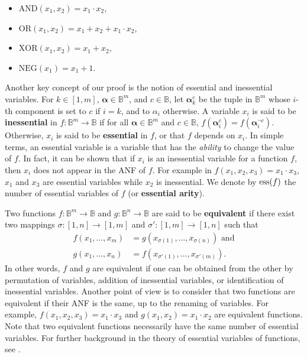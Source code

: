 \begin{itemize}
  \item $\text{AND}(x_1, x_2) = x_1 \cdot x_2$,
  \item $\text{OR}(x_1, x_2) = x_1 + x_2 + x_1 \cdot x_2$,
  \item $\text{XOR}(x_1, x_2) = x_1 + x_2$,
  \item $\text{NEG}(x_1) = x_1 + 1$.
\end{itemize}

Another key concept of our proof is the notion of essential and inessential
variables.  For $k\in [1,m]$, $\boldsymbol{\alpha}\in \mathbb{B}^m$, and $c \in
\mathbb{B}$, let ${\boldsymbol{\alpha}}_{k}^c$ be the tuple in $\mathbb{B}^{m}$
whose $i$-th component is set to $c$ if $i=k$, and to $\alpha_i$ otherwise.  A
variable $x_i$ is said to be \textbf{inessential} in $f\colon \mathbb{B}^m\to
\mathbb{B}$ if for all $\boldsymbol{\alpha} \in \mathbb{B}^m$ and $c \in
\mathbb{B}$, $f(\boldsymbol{\alpha}^c_i) = f(\boldsymbol{\alpha}^{\neg c}_i)$.
Otherwise, $x_i$ is said to be \textbf{essential} in $f$, or that $f$ depends
on $x_i$. In simple terms, an essential variable is a variable that has the
\textit{ability} to change the value of $f$. In fact, it can be shown that if
$x_i$ is an inessential variable for a function $f$, then $x_i$ does not appear
in the ANF of $f$.  For example in $f(x_1, x_2, x_3) = x_1 \cdot x_3$, $x_1$
and $x_3$ are essential variables while $x_2$ is inessential.  We denote by
$\operatorname{ess}(f)$ the number of essential variables of $f$ (or \textbf{essential
arity}).

Two functions $f\colon \mathbb{B}^m\to \mathbb{B}$ and $g\colon \mathbb{B}^n\to
\mathbb{B}$ are said to be {\bf equivalent} if there exist two mappings
$\sigma\colon
[1,n]\to [1,m]$ and $\sigma'\colon [1,m]\to [1,n]$ such that
\begin{align*}
  f(x_1,\ldots , x_m)&=g(x_{\sigma(1)},\ldots,x_{\sigma(n)}) \text{ and} \\
   g(x_1,\ldots , x_n)&=f(x_{\sigma'(1)},\ldots,x_{\sigma'(m)}).
\end{align*}
In other words, $f$ and $g$ are equivalent if one can be obtained from the
other by permutation of variables, addition of inessential variables, or
identification of inessential variables. Another point of view is to consider
that two functions are equivalent if their ANF is the same, up to the
renaming of variables. For example, $f(x_1, x_2, x_3) = x_1
\cdot x_3$ and $g(x_1, x_2)  = x_1 \cdot x_2$ are equivalent functions. Note
that two equivalent functions necessarily have the same number of essential
variables. For further background in the theory of essential variables of
functions, see \cite{CouceiroTCS08, CouceiroDM09, SalomaaAASF63, WillardDM96}.

